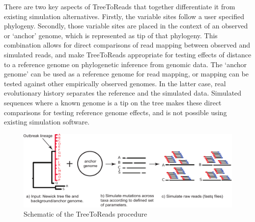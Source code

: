 There are two key aspects of TreeToReads that together differentiate it from existing simulation alternatives.
Firstly, the variable sites follow a user specified phylogeny.
Secondly, those variable sites are placed in the context of an observed or `anchor' genome, which is represented as tip of that phylogeny.
This combination allows for direct comparisons of read mapping between observed and simulated reads, 
and make TreeToReads appropriate for testing effects of distance to a reference genome on phylogenetic inference from genomic data.
The `anchor genome' can be used as a reference genome for read mapping, or mapping can be tested against other empirically observed genomes.
In the latter case, real evolutionary history separates the reference and the simulated data.
Simulated sequences where a known genome is a tip on the tree makes these direct comparisons for testing reference genome effects, 
and is not possible using existing simulation software.

\begin{figure}[trees]
\includegraphics[width=6.5in]{TTR-figure}
\caption{Schematic of the TreeToReads procedure}
\label{scheme}
\end{figure}

